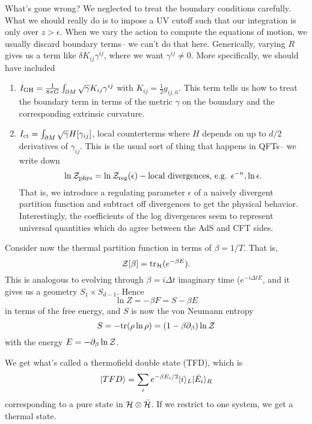 What's gone wrong? We neglected to treat the boundary conditions carefully. What we should really do is to impose a UV cutoff such that our integration is only over $z>\epsilon$. When we vary the action to compute the equations of motion, we usually discard boundary terms-- we can't do that here. Generically, varying $R$ gives us a term like $\delta K_{ij} \gamma^{ij}$, where we want $\gamma^{ij}\neq 0$. More specifically, we should have included
\begin{enumerate}
    \item $I_\text{GH}=\frac{1}{8\pi G} \int_{\partial M} \sqrt{\gamma} K_{ij} \gamma^{ij}$ with $K_{ij}=\frac{1}{2} g_{ij,\hat n}$. This  term tells us how to treat the boundary term in terms of the metric $\gamma$ on the boundary and the corresponding extrinsic curvature.
    \item $I_\text{ct}=\int_{\partial M} \sqrt{\gamma} H[\gamma_{ij}]$, local counterterms where $H$ depends on up to $d/2$ derivatives of $\gamma_{ij}$. This is the usual sort of thing that happens in QFTs-- we write down 
    \begin{equation}
        \ln \mathcal Z_\text{phys} =\ln \mathcal Z_\text{reg}(\epsilon) - \text{local divergences, e.g. }\epsilon^{-n},\ln \epsilon.
    \end{equation}
    That is, we introduce a regulating parameter $\epsilon$ of a naively divergent partition function and subtract off divergences to get the physical behavior. Interestingly, the coefficients of the log divergences seem to represent universal quantities which do agree between the AdS and CFT sides.
\end{enumerate}
Consider now the thermal partition function in terms of $\beta=1/T$. That is,
\begin{equation}
     \mathcal Z[\beta] =\text{tr}_\mathcal H(e^{-\beta E}).
\end{equation}
This is analogous to evolving through $\beta = i\Delta t$ imaginary time ($e^{-i\Delta t E}$, and it gives us a geometry $S_1 \times S_{d-1}$. Hence
\begin{equation}
    \ln Z= -\beta F = S-\beta E
\end{equation}
in terms of the free energy, and $S$ is now the von Neumann entropy
\begin{equation}
    S=-\text{tr}(\rho\ln \rho)=(1-\beta \partial_\beta)\ln \mathcal Z
\end{equation}
with the energy $E=-\partial_\beta \ln \mathcal Z$.

We get what's called a thermofield double state (TFD), which is
\begin{equation}
    \lvert TFD\rangle=\sum_i e^{-\beta E_i/2} \lvert i\rangle_L \lvert\bar E_i\rangle_R
\end{equation}
corresponding to a pure state in $\mathcal H\otimes \bar {\mathcal H}$. If we restrict to one system, we get a thermal state.

